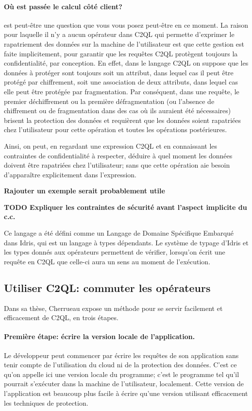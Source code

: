 \paragraph{\og Où est passée le calcul côté client?\fg{}}
est peut-être une question que vous vous posez peut-être en ce moment.
La raison pour laquelle il n'y a aucun opérateur dans C2QL 
qui permette d'exprimer le rapatriement des données sur la machine de l'utilisateur
est que cette gestion est faite implicitement, pour garantir
que les requêtes C2QL protègent toujours la confidentialité, par conception.
En effet, dans le langage C2QL on suppose que les données à protéger sont toujours
soit un attribut, dans lequel cas il peut être protégé par chiffrement,
soit une association de deux attributs, dans lequel cas elle peut être protégée
par fragmentation. Par conséquent, dans une requête, le premier déchiffrement 
ou la première défragmentation (ou l'absence de chiffrement ou de
fragmentation dans des cas où ils auraient été nécessaires)
brisent la protection des données et requièrent que
les données soient rapatriées chez l'utilisateur pour cette opération et toutes
les opérations postérieures.

Ainsi, on peut, en regardant une expression C2QL et en connaissant les
contraintes de confidentialité à respecter,
déduire à quel moment les données doivent être rapatriées chez l'utilisateur;
sans que cette opération aie besoin d'apparaître explicitement dans l'expression.

\textbf{Rajouter un exemple serait probablement utile}

\textbf{TODO Expliquer les contraintes de sécurité avant l'aspect implicite
	du c.c.}

Ce langage a été défini comme un Langage de Domaine Spécifique Embarqué dans
Idris, qui est un langage à types dépendants.
Le système de typage d'Idris et les types donnés aux opérateurs permettent
de vérifier, lorsqu'on écrit une requête en C2QL que celle-ci aura un sens
au moment de l'exécution.

\subsection{Utiliser C2QL: commuter les opérateurs}
\label{passage}
Dans sa thèse, Cherrueau expose un méthode pour se servir facilement
et efficacement de C2QL, en trois étapes.

\paragraph{Première étape: écrire la version locale de l'application.}
Le développeur peut commencer par écrire les requêtes de son application
sans tenir compte de l'utilisation du cloud ni de la protection
des données. C'est ce qu'on appelle ici une version \og locale \fg{}
du programme; c'est le programme tel qu'il pourrait s'exécuter dans la machine de l'utilisateur, localement.
Cette version de l'application est beaucoup plus facile à écrire 
qu'une version utilisant efficacement les techniques de protection.

